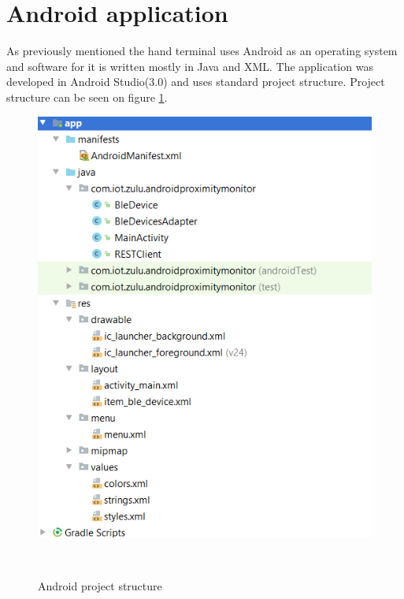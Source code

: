 \section {Android application}
\label {Impl_AndroidNodeSection}

	As previously mentioned the hand terminal uses Android as an operating system and software for it is written mostly in Java and XML. The application was developed in Android Studio(3.0) and uses standard project structure. Project structure can be seen on figure \ref{fig:AndroidProjectStructure}.

\begin{figure}[H]
\centering
\includegraphics[scale=0.6]{gfx/AndroidProjectStructure}
\caption{Android project structure}~\label{fig:AndroidProjectStructure}
\end{figure}

